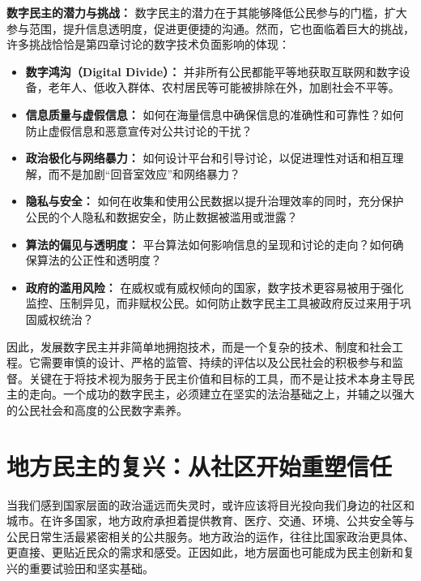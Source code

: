 \documentclass[UTF8, 10pt]{ctexbook}
\begin{document}
\textbf{数字民主的潜力与挑战：}
数字民主的潜力在于其能够降低公民参与的门槛，扩大参与范围，提升信息透明度，促进更便捷的沟通。然而，它也面临着巨大的挑战，许多挑战恰恰是第四章讨论的数字技术负面影响的体现：
\begin{itemize}
    \item \textbf{数字鸿沟（Digital Divide）：} 并非所有公民都能平等地获取互联网和数字设备，老年人、低收入群体、农村居民等可能被排除在外，加剧社会不平等。
    \item \textbf{信息质量与虚假信息：} 如何在海量信息中确保信息的准确性和可靠性？如何防止虚假信息和恶意宣传对公共讨论的干扰？
    \item \textbf{政治极化与网络暴力：} 如何设计平台和引导讨论，以促进理性对话和相互理解，而不是加剧“回音室效应”和网络暴力？
    \item \textbf{隐私与安全：} 如何在收集和使用公民数据以提升治理效率的同时，充分保护公民的个人隐私和数据安全，防止数据被滥用或泄露？
    \item \textbf{算法的偏见与透明度：} 平台算法如何影响信息的呈现和讨论的走向？如何确保算法的公正性和透明度？
    \item \textbf{政府的滥用风险：} 在威权或有威权倾向的国家，数字技术更容易被用于强化监控、压制异见，而非赋权公民。如何防止数字民主工具被政府反过来用于巩固威权统治？
\end{itemize}
因此，发展数字民主并非简单地拥抱技术，而是一个复杂的技术、制度和社会工程。它需要审慎的设计、严格的监管、持续的评估以及公民社会的积极参与和监督。关键在于将技术视为服务于民主价值和目标的工具，而不是让技术本身主导民主的走向。一个成功的数字民主，必须建立在坚实的法治基础之上，并辅之以强大的公民社会和高度的公民数字素养。

\section{地方民主的复兴：从社区开始重塑信任}
\lettrine[lines=2]{当}{我们}感到国家层面的政治遥远而失灵时，或许应该将目光投向我们身边的社区和城市。在许多国家，地方政府承担着提供教育、医疗、交通、环境、公共安全等与公民日常生活最紧密相关的公共服务。地方政治的运作，往往比国家政治更具体、更直接、更贴近民众的需求和感受。正因如此，地方层面也可能成为民主创新和复兴的重要试验田和坚实基础。
\end{document}

